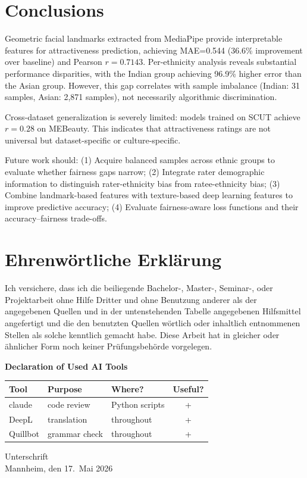 \documentclass[a4paper,oneside,bibliography=totoc]{scrbook}
\begin{document}
\chapter{Conclusions}

Geometric facial landmarks extracted from MediaPipe provide interpretable features for attractiveness prediction, achieving MAE=0.544 (36.6\% improvement over baseline) and Pearson $r=0.7143$. Per-ethnicity analysis reveals substantial performance disparities, with the Indian group achieving 96.9\% higher error than the Asian group. However, this gap correlates with sample imbalance (Indian: 31 samples, Asian: 2,871 samples), not necessarily algorithmic discrimination.

Cross-dataset generalization is severely limited: models trained on SCUT achieve $r=0.28$ on MEBeauty. This indicates that attractiveness ratings are not universal but dataset-specific or culture-specific.

Future work should: (1) Acquire balanced samples across ethnic groups to evaluate whether fairness gaps narrow; (2) Integrate rater demographic information to distinguish rater-ethnicity bias from ratee-ethnicity bias; (3) Combine landmark-based features with texture-based deep learning features to improve predictive accuracy; (4) Evaluate fairness-aware loss functions and their accuracy--fairness trade-offs.



\appendix


\backmatter

\chapter{Ehrenwörtliche Erklärung}

Ich versichere, dass ich die beiliegende Bachelor-, Master-, Seminar-, oder Projektarbeit ohne Hilfe Dritter und ohne Benutzung anderer als der angegebenen Quellen und in der untenstehenden Tabelle angegebenen Hilfsmittel angefertigt und die den benutzten Quellen wörtlich oder inhaltlich entnommenen Stellen als solche kenntlich gemacht habe. Diese Arbeit hat in gleicher oder ähnlicher Form noch keiner Prüfungsbehörde vorgelegen.

\begin{center}
  \textbf{Declaration of Used AI Tools} \\[.3em]
  \begin{tabularx}{\textwidth}{lXlc}
    \toprule
    Tool & Purpose & Where? & Useful? \\
    \midrule
    claude & code review & Python scripts & + \\
        \midrule
    DeepL & translation & throughout & + \\
            \midrule
    Quillbot & grammar check & throughout & + \\
    \bottomrule
  \end{tabularx}
\end{center}

\vspace{2cm}
\noindent Unterschrift\\
\noindent Mannheim, den 17.~Mai 2026 \hfill
\end{document}
